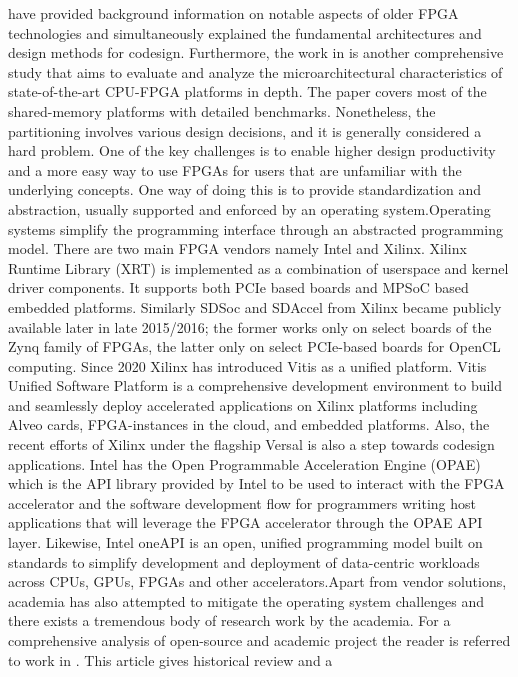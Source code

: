 have provided background information on notable aspects of older FPGA technologies and simultaneously explained the fundamental architectures and design methods for codesign. Furthermore, the work in \cite{microarchitecture} is another comprehensive study that aims to evaluate and analyze the microarchitectural characteristics of state-of-the-art CPU-FPGA platforms in depth. The paper covers most of the shared-memory platforms with detailed benchmarks. Nonetheless, the partitioning involves various design decisions, and it is generally considered a hard problem. One of the key challenges is to enable higher design productivity and a more easy way to use FPGAs for users that are unfamiliar with the underlying concepts. One way of doing this is to provide standardization and abstraction, usually supported and enforced by an operating system.\newline Operating systems simplify the programming interface through an abstracted programming model. There are two main FPGA vendors namely Intel and Xilinx. Xilinx Runtime Library (XRT) \cite{XRT} is implemented as a combination of userspace and kernel driver components. It supports both PCIe based boards and MPSoC based embedded platforms. Similarly SDSoc \cite{sdsoc} and SDAccel \cite{sdaccel} from Xilinx became publicly available later in late 2015/2016; the former works only on select boards of the Zynq family of FPGAs, the latter only on select PCIe-based boards for OpenCL computing. Since 2020 Xilinx has introduced Vitis \cite{vitis} as a unified platform. Vitis Unified Software Platform is a comprehensive development environment to build and seamlessly deploy accelerated applications on Xilinx platforms including Alveo cards, FPGA-instances in the cloud, and embedded platforms. Also, the recent efforts of Xilinx under the flagship Versal \cite{versal} is also a step towards codesign applications. \newline Intel has the Open Programmable Acceleration Engine (OPAE) \cite{intelopae} which is the API library provided by Intel to be used to interact with the FPGA accelerator and the software development flow for programmers writing host applications that will leverage the FPGA accelerator through the OPAE API layer. Likewise, Intel oneAPI \cite{inteloneapi} is an open, unified programming model built on standards to simplify development and deployment of data-centric workloads across CPUs, GPUs, FPGAs and other accelerators.\newline Apart from vendor solutions, academia has also attempted to mitigate the operating system challenges and there exists a tremendous body of research work by the academia. For a comprehensive analysis of open-source and academic project the reader is referred to work in \cite{reconfig_os, connectal}. This article gives historical review and a
